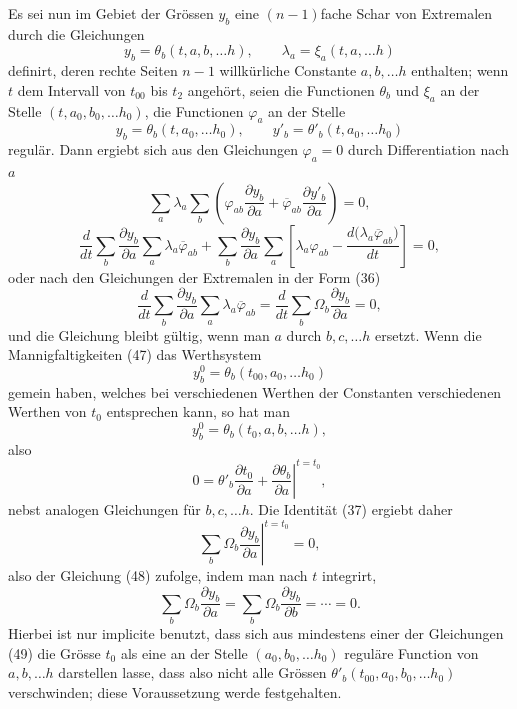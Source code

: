 \documentclass[11pt,a4paper,leqno]{article}
\begin{document}
Es sei nun im Gebiet der Grössen $y_b$ eine $(n-1)$fache Schar von Extremalen durch die Gleichungen
\begin{equation}\tag{47}
y_b=\theta_b(t,a,b,\ldots h),
\qquad
\lambda_a=\xi_a(t,a,\ldots h)
\end{equation}
definirt, deren rechte Seiten $n-1$ willkürliche Constante $a,b,\ldots h$ enthalten; wenn $t$ dem Intervall von $t_{00}$ bis $t_2$ angehört, seien die Functionen $\theta_b$ und $\xi_a$ an der Stelle $(t,a_0,b_0,\ldots h_0)$, die Functionen $\varphi_a$ an der Stelle
\[
y_b=\theta_b(t,a_0,\ldots h_0),
\qquad
y'_b=\theta'_b(t,a_0,\ldots h_0)
\]
regulär. Dann ergiebt sich aus den Gleichungen $\varphi_a=0$ durch Differentiation nach $a$
\[
\sum_a\lambda_a\sum_b
\left(
\varphi_{ab}\frac{\partial y_b}{\partial a}
+\overline{\varphi}_{ab}\frac{\partial y'_b}{\partial a}
\right)=0,
\]
\[
\frac{d}{dt}\sum_b\frac{\partial y_b}{\partial a}
\sum_a\lambda_a\overline{\varphi}_{ab}
+\sum_b\frac{\partial y_b}{\partial a}
\sum_a\left[
\lambda_a\varphi_{ab}-
\frac{d\bigl(\lambda_a\overline{\varphi}_{ab}\bigr)}{dt}
\right]=0,
\]
oder nach den Gleichungen der Extremalen in der Form (36)
\begin{equation}\tag{48}
\frac{d}{dt}\sum_b\frac{\partial y_b}{\partial a}
\sum_a\lambda_a\overline{\varphi}_{ab}
=\frac{d}{dt}\sum_b\Omega_b\frac{\partial y_b}{\partial a}=0,
\end{equation}
und die Gleichung bleibt gültig, wenn man $a$ durch $b,c,\ldots h$ ersetzt. Wenn die Mannigfaltigkeiten (47) das Werthsystem
\[
y_b^0=\theta_b(t_{00},a_0,\ldots h_0)
\]
gemein haben, welches bei verschiedenen Werthen der Constanten verschiedenen Werthen von $t_0$ entsprechen kann, so hat man
\begin{equation}\tag{49}
y_b^0=\theta_b(t_0,a,b,\ldots h),
\end{equation}
also
\[
0=\theta'_b\frac{\partial t_0}{\partial a}
+\left.\frac{\partial\theta_b}{\partial a}\right|^{t=t_0},
\]
nebst analogen Gleichungen für $b,c,\ldots h$. Die Identität (37) ergiebt daher
\[
\left.\sum_b\Omega_b\frac{\partial y_b}{\partial a}\right|^{t=t_0}=0,
\]
also der Gleichung (48) zufolge, indem man nach $t$ integrirt,
\begin{equation}\tag{50}
\sum_b\Omega_b\frac{\partial y_b}{\partial a}
=\sum_b\Omega_b\frac{\partial y_b}{\partial b}=\cdots=0.
\end{equation}
Hierbei ist nur implicite benutzt, dass sich aus mindestens einer der Gleichungen (49) die Grösse $t_0$ als eine an der Stelle $(a_0,b_0,\ldots h_0)$ reguläre Function von $a,b,\ldots h$ darstellen lasse, dass also nicht alle Grössen $\theta'_b(t_{00},a_0,b_0,\ldots h_0)$ verschwinden; diese Voraussetzung werde festgehalten.
\end{document}
